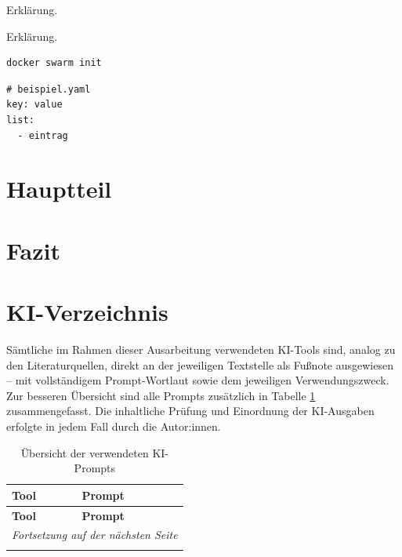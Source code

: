 \documentclass[12pt,a4paper]{article}
\newcommand{\kirows}{}
\begin{document}
\begin{description}[leftmargin=3cm, style=nextline]
    \item[Begriff A] Erklärung.
    \item[Begriff B] Erklärung.
\end{description}

\begin{lstlisting}
docker swarm init
\end{lstlisting}

\begin{lstlisting}[style=yaml]
# beispiel.yaml
key: value
list:
  - eintrag
\end{lstlisting}

\section{Hauptteil}

\section{Fazit}

\section{KI-Verzeichnis}

Sämtliche im Rahmen dieser Ausarbeitung verwendeten KI-Tools sind, analog zu den Literaturquellen, direkt an der jeweiligen Textstelle als Fußnote ausgewiesen -- mit vollständigem Prompt-Wortlaut sowie dem jeweiligen Verwendungszweck. Zur besseren Übersicht sind alle Prompts zusätzlich in Tabelle \ref{tab:ki-verzeichnis} zusammengefasst. Die inhaltliche Prüfung und Einordnung der KI-Ausgaben erfolgte in jedem Fall durch die Autor:innen.

\begin{longtable}{@{}p{2.5cm}p{11.5cm}@{}}
    \caption{Übersicht der verwendeten KI-Prompts}\label{tab:ki-verzeichnis}\\
    \toprule
    \textbf{Tool} & \textbf{Prompt} \\
    \midrule
    \endfirsthead
    \toprule
    \textbf{Tool} & \textbf{Prompt} \\
    \midrule
    \endhead
    \midrule
    \multicolumn{2}{r}{\textit{Fortsetzung auf der nächsten Seite}} \\
    \midrule
    \endfoot
    \bottomrule
    \endlastfoot
    \kirows
\end{longtable}

\newpage
\printbibliography
\end{document}
